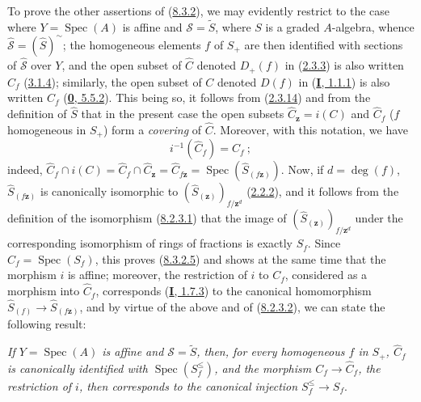 To prove the other assertions of
(\hyperref[II.8.3.2]{8.3.2}), we may evidently restrict to the case where
$Y=\operatorname{Spec}(A)$ is affine and $\mathcal{S}=\widetilde{S}$, where $S$
is a graded $A$-algebra, whence
$\widehat{\mathcal{S}}=(\widehat{S})^{\sim}$; the homogeneous elements $f$ of
$S_+$ are then identified with sections of $\widehat{\mathcal{S}}$ over
$Y$, and the open subset of $\widehat{C}$ denoted $D_+(f)$ in
(\hyperref[II.2.3.3]{2.3.3}) is also written $\widehat{C}_f$
(\hyperref[II.3.1.4]{3.1.4}); similarly, the open subset of $C$ denoted
$D(f)$ in (\hyperref[I.1.1.1]{\textbf{I}, 1.1.1}) is also written $C_f$
(\hyperref[0.5.5.2]{\textbf{0}, 5.5.2}). This being so, it follows from
(\hyperref[II.2.3.14]{2.3.14}) and from the definition of $\widehat{S}$ that
in the present case the open subsets $\widehat{C}_{\mathbf{z}}=i(C)$ and $\widehat{C}_f$
($f$ homogeneous in $S_+$) form a \emph{covering} of
$\widehat{C}$. Moreover, with this notation, we have
\begin{equation}
\label{II.8.3.2.5}
  i^{-1}(\widehat{C}_f)=C_f~;
\tag{8.3.2.5}
\end{equation}
indeed,
$\widehat{C}_f\cap i(C)=\widehat{C}_f\cap\widehat{C}_{\mathbf{z}}
=\widehat{C}_{f\mathbf{z}}=\operatorname{Spec}(\widehat{S}_{(f\mathbf{z})})$. Now, if
$d=\deg(f)$, $\widehat{S}_{(f\mathbf{z})}$ is canonically isomorphic to
$(\widehat{S}_{(\mathbf{z})})_{f/\mathbf{z}^d}$ (\hyperref[II.2.2.2]{2.2.2}), and it follows
from the definition of the isomorphism
(\hyperref[II.8.2.3.1]{8.2.3.1}) that the image of
$(\widehat{S}_{(\mathbf{z})})_{f/\mathbf{z}^d}$ under the corresponding isomorphism of rings of
fractions is exactly $S_f$. Since $C_f=\operatorname{Spec}(S_f)$, this
proves (\hyperref[II.8.3.2.5]{8.3.2.5}) and shows at the same time that the
morphism $i$ is affine; moreover, the restriction of $i$ to $C_f$,
considered as a morphism into $\widehat{C}_f$, corresponds
(\hyperref[I.1.7.3]{\textbf{I}, 1.7.3}) to the canonical homomorphism
$\widehat{S}_{(f)}\to\widehat{S}_{(f\mathbf{z})}$, and by virtue of the above and of
(\hyperref[II.8.2.3.2]{8.2.3.2}), we can state the following result:

\begin{env}[8.3.2.6]
\label{II.8.3.2.6}
\emph{If $Y=\operatorname{Spec}(A)$ is affine and $\mathcal{S}=\widetilde{S}$,
then, for every homogeneous $f$ in $S_+$, $\widehat{C}_f$ is canonically
identified with $\operatorname{Spec}(S_f^{\leq})$, and the morphism
$C_f\to\widehat{C}_f$, the restriction of $i$, then corresponds to the canonical
injection $S_f^{\leq}\to S_f$}.
\end{env}

